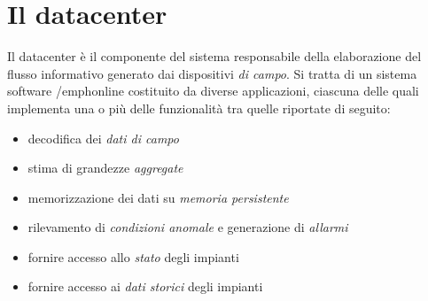 \clearpage{\pagestyle{empty}\cleardoublepage}
\chapter{Il datacenter}\label{sec:datacenter}
Il datacenter \`e il componente del sistema responsabile della elaborazione 
del flusso informativo generato dai dispositivi \emph{di campo}.
%
Si tratta di un sistema software /emph{online} costituito da 
diverse applicazioni, ciascuna delle quali implementa una o pi\`u delle 
funzionalit\`a tra quelle riportate di seguito:
%
\begin{itemize}
  \item decodifica dei \emph{dati di campo}
  \item stima di grandezze \emph{aggregate}
  \item memorizzazione dei dati su \emph{memoria persistente}
  \item rilevamento di \emph{condizioni anomale} e generazione di \emph{allarmi}
  \item fornire accesso allo \emph{stato} degli impianti
  \item fornire accesso ai \emph{dati storici} degli impianti
\end{itemize}
%

